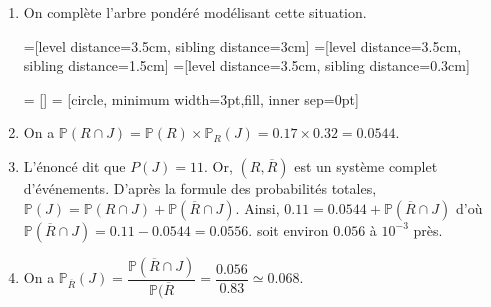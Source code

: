 \documentclass[11pt,fleqn, openany]{book} %
\begin{document}
\begin{solution}\hspace{0pt}

\begin{enumerate}
\item On complète l'arbre pondéré modélisant cette situation.


=[level distance=3.5cm, sibling distance=3cm]
=[level distance=3.5cm, sibling distance=1.5cm]
=[level distance=3.5cm, sibling distance=0.3cm]

 = []
 = [circle, minimum width=3pt,fill, inner sep=0pt]


\begin{center}
\end{center}

\item On a $\mathbb{P}(R \cap J)=\mathbb{P}(R)\times\mathbb{P}_R(J)=0.17 \times 0.32 = 0.0544$.
\item L'énoncé dit que $P(J)=11$. Or, $(R,\overline{R})$ est un système complet d'événements. D'après la formule des probabilités totales, $\mathbb{P}(J)=\mathbb{P}(R \cap J)+\mathbb{P}(\overline{R} \cap J)$. Ainsi, $0.11=0.0544+\mathbb{P}(\overline{R} \cap J)$ d'où $\mathbb{P}(\overline{R} \cap J)=0.11-0.0544=0.0556$.  soit environ $0.056$ à $10^{-3}$ près.
\item On a $\mathbb{P}_{\overline{R}}(J)=\dfrac{\mathbb{P}(\overline{R} \cap J)}{\mathbb{P}(\overline{R}}=\dfrac{0.056}{0.83}\simeq 0.068$.

\end{enumerate}\end{solution}
\end{document}
